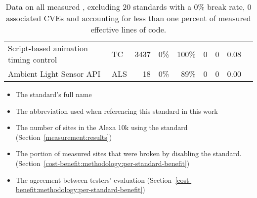 \begin{table}[ht]
{\begin{tabular}{ l | l r r r | r r | r | l }
      Script-based animation timing control          &  TC          & 3437  & 0\%          & 100\% & 0   & 0  & 0.08  & \cite{nikiforakis2013cookieless} \\ %
      Ambient Light Sensor API                            &  ALS         & 18    & 0\%          & 89\%  & 0   & 0  & 0.00  & \cite{nikiforakis2013cookieless,olejnik2017stealing} \\ %
    \bottomrule
  \end{tabular}
  }
  \caption{
    Data on all \NumStandards measured \WASs, excluding 20 standards with a 0\% break rate, 0 associated CVEs
    and accounting for less than one percent of measured effective lines of code.
  }
  \begin{small}
    \begin{itemize}
      \setlength{\itemsep}{-2pt}
      \item The standard's full name
      \item The abbreviation used when referencing this standard in this work
      \item The number of sites in the Alexa 10k using the standard (Section~\ref{measurement:results})
      \item The portion of measured sites that were broken by disabling the
        standard. (Section~\ref{cost-benefit:methodology:per-standard-benefit})
      \item The agreement between testers' evaluation (Section~\ref{cost-benefit:methodology:per-standard-benefit})

\end{itemize}
\end{small}
\end{table}
